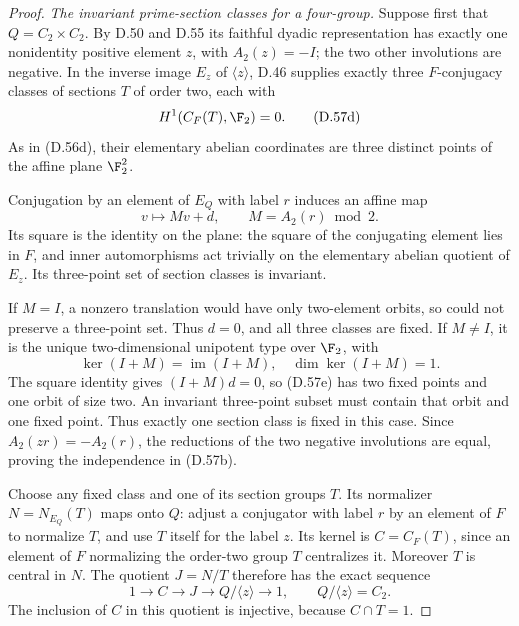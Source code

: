 \begin{proof}
\emph{The invariant prime-section classes for a four-group.}
Suppose first that $Q=C_2\times C_2$.
By D.50 and D.55 its faithful dyadic
representation has exactly one nonidentity
positive element $z$, with $A_2(z)=-I$;
the two other involutions are negative.
In the inverse image $E_z$ of
$\langle z\rangle$, D.46 supplies exactly
three $F$-conjugacy classes of sections
$T$ of order two, each with
\[
                         H^1(C_F(T),\F_2)=0.             \tag{D.57d}
\]
As in (D.56d), their elementary abelian
coordinates are three distinct points
of the affine plane $\F_2^2$.

Conjugation by an element of $E_Q$
with label $r$ induces an affine map
\[
                           v\longmapsto Mv+d,
                    \qquad M=A_2(r)\bmod2.              \tag{D.57e}
\]
Its square is the identity on the plane:
the square of the conjugating element
lies in $F$, and inner automorphisms
act trivially on the elementary abelian
quotient of $E_z$.
Its three-point set of section classes
is invariant.

If $M=I$, a nonzero translation would
have only two-element orbits, so could
not preserve a three-point set.
Thus $d=0$, and all three classes are
fixed. If $M\ne I$, it is the unique
two-dimensional unipotent type over
$\F_2$, with
\[
          \ker(I+M)=\operatorname{im}(I+M),
                         \quad\dim\ker(I+M)=1.
\]
The square identity gives $(I+M)d=0$,
so (D.57e) has two fixed points and
one orbit of size two.
An invariant three-point subset must
contain that orbit and one fixed
point. Thus exactly one section
class is fixed in this case.
Since $A_2(zr)=-A_2(r)$, the reductions
of the two negative involutions are
equal, proving the independence in
(D.57b).

Choose any fixed class and one of
its section groups $T$.
Its normalizer $N=N_{E_Q}(T)$ maps
onto $Q$: adjust a conjugator with
label $r$ by an element of $F$ to
normalize $T$, and use $T$ itself
for the label $z$.
Its kernel is $C=C_F(T)$, since an
element of $F$ normalizing the
order-two group $T$ centralizes it.
Moreover $T$ is central in $N$.
The quotient $J=N/T$ therefore has
the exact sequence
\[
                  1\longrightarrow C\longrightarrow J
                     \longrightarrow Q/\langle z\rangle
                     \longrightarrow1,
                  \qquad Q/\langle z\rangle=C_2.        \tag{D.57f}
\]
The inclusion of $C$ in this quotient
is injective, because $C\cap T=1$.


\end{proof}
